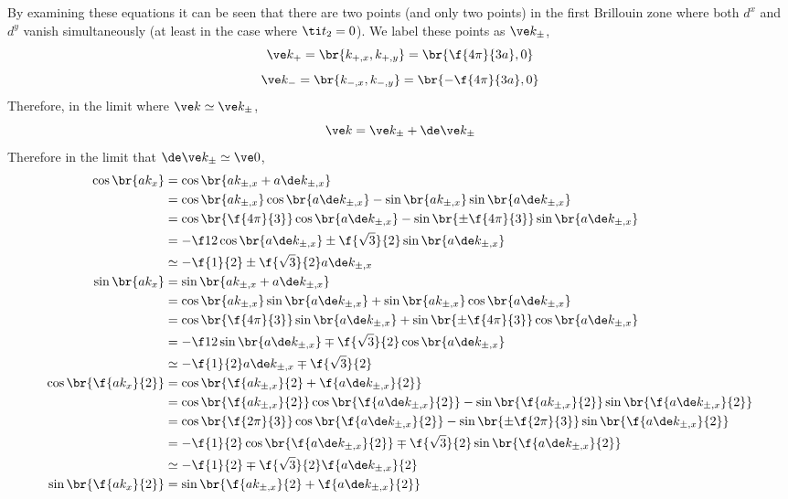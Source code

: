 \documentclass{article}
\begin{document}
By examining these equations it can be seen that there are two points (and only two points) in the first Brillouin zone where both $d^{x}$ and $d^y$ vanish simultaneously (at least in the case where $\ti t_2 = 0$). We label these points as $\ve k_{\pm}$,
\[ \ve k_+ = \br{k_{+, x}, k_{+, y}} = \br{\f{4 \pi }{3a}, 0} \]
\[ \ve k_- = \br{k_{-, x}, k_{-, y}} = \br{-\f{4 \pi }{3a}, 0} \]
Therefore, in the limit where $\ve k \simeq \ve k_{\pm}$,
\[ \ve k = \ve k_{\pm} + \de \ve k_{\pm} \]
Therefore in the limit that $\de \ve k_{\pm} \simeq \ve 0$,
\begin{align*}
    \cos \br{ak_x} &= \cos \br{ak_{\pm,x} + a\de k_{\pm,x}} \\
    &= \cos \br{ak_{\pm,x}}\cos \br{a\de k_{\pm,x}} - \sin \br{ak_{\pm,x}}\sin \br{a\de k_{\pm,x}} \\
    &= \cos \br{\f{4\pi}{3}}\cos \br{a\de k_{\pm,x}} - \sin \br{\pm\f{4\pi}{3}}\sin \br{a\de k_{\pm,x}} \\
    &= -\f12\cos \br{a\de k_{\pm,x}} \pm \f{\sqrt{3}}{2}\sin \br{a\de k_{\pm,x}} \\
    &\simeq -\f{1}{2} \pm \f{\sqrt{3}}{2}a\de k_{\pm,x} \\
    \sin \br{ak_x} &= \sin \br{ak_{\pm,x} + a\de k_{\pm,x}} \\
    &= \cos \br{ak_{\pm,x}}\sin \br{a\de k_{\pm,x}} + \sin \br{ak_{\pm,x}}\cos \br{a\de k_{\pm,x}}\\
    &= \cos \br{\f{4\pi}{3}}\sin \br{a\de k_{\pm,x}} + \sin \br{\pm\f{4\pi}{3}}\cos \br{a\de k_{\pm,x}} \\
    &= -\f12\sin \br{a\de k_{\pm,x}} \mp \f{\sqrt{3}}{2}\cos \br{a\de k_{\pm,x}} \\
    &\simeq -\f{1}{2}a\de k_{\pm,x} \mp \f{\sqrt{3}}{2} \\
    \cos \br{\f{ak_x}{2}} &= \cos \br{\f{ak_{\pm,x}}{2} + \f{a\de k_{\pm,x}}{2}} \\
    &= \cos \br{\f{ak_{\pm,x}}{2}}\cos \br{\f{a\de k_{\pm,x}}{2}} - \sin \br{\f{ak_{\pm,x}}{2}}\sin \br{\f{a\de k_{\pm,x}}{2}} \\
    &= \cos \br{\f{2 \pi}{3}}\cos \br{\f{a\de k_{\pm,x}}{2}} - \sin \br{\pm\f{2 \pi}{3}}\sin \br{\f{a\de k_{\pm,x}}{2}} \\
    &= -\f{1}{2}\cos \br{\f{a\de k_{\pm,x}}{2}} \mp \f{\sqrt{3}}{2}\sin \br{\f{a\de k_{\pm,x}}{2}} \\
    &\simeq -\f{1}{2} \mp \f{\sqrt{3}}{2}\f{a\de k_{\pm,x}}{2} \\
    \sin \br{\f{ak_x}{2}} &= \sin \br{\f{ak_{\pm,x}}{2} + \f{a\de k_{\pm,x}}{2}} \\

\end{align*}
\end{document}
